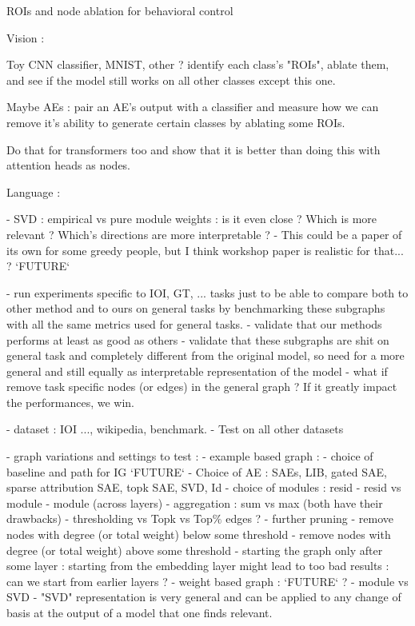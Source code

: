 \documentclass{article}
\begin{document}
ROIs and node ablation for behavioral control

Vision :

Toy CNN classifier, MNIST, other ? identify each class's "ROIs", ablate them, and see if the model still works on all other classes except this one.

Maybe AEs : pair an AE's output with a classifier and measure how we can remove it's ability to generate certain classes by ablating some ROIs.

Do that for transformers too and show that it is better than doing this with attention heads as nodes.

Language :



- SVD : empirical vs pure module weights : is it even close ? Which is more relevant ? Which's directions are more interpretable ?
    - This could be a paper of its own for some greedy people, but I think workshop paper is realistic for that... ? `FUTURE`

- run experiments specific to IOI, GT, ... tasks just to be able to compare both to other method and to ours on general tasks by benchmarking these subgraphs with all the same metrics used for general tasks.
    - validate that our methods performs at least as good as others
    - validate that these subgraphs are shit on general task and completely different from the original model, so need for a more general and still equally as interpretable representation of the model
    - what if remove task specific nodes (or edges) in the general graph ? If it greatly impact the performances, we win.

- dataset : IOI ..., wikipedia, benchmark.
    - Test on all other datasets

- graph variations and settings to test :
    - example based graph :
        - choice of baseline and path for IG `FUTURE`
        - Choice of AE : SAEs, LIB, gated SAE, sparse attribution SAE, topk SAE, SVD, Id
        - choice of modules : resid - resid vs module - module (across layers)
        - aggregation : sum vs max (both have their drawbacks)
        - thresholding vs Topk vs Top$\%$ edges ?
        - further pruning
            - remove nodes with degree (or total weight) below some threshold
            - remove nodes with degree (or total weight) above some threshold
            - starting the graph only after some layer : starting from the embedding layer might lead to too bad results : can we start from earlier layers ?
    - weight based graph :
    `FUTURE` ?
        - module vs SVD
            - "SVD" representation is very general and can be applied to any change of basis at the output of a model that one finds relevant.
\end{document}
